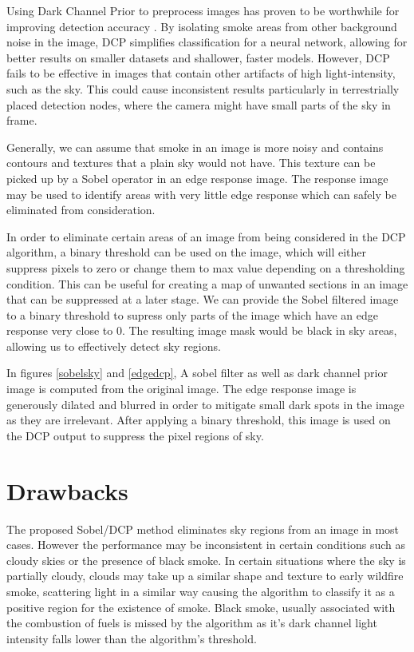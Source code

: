 \documentclass[lettersize,journal]{IEEEtran}
\begin{document}
Using Dark Channel Prior to preprocess images has proven to be
worthwhile for improving detection accuracy
\cite{dcpsmoke}\cite{dcpsmoke2}. By isolating smoke areas from other
background noise in the image, DCP simplifies classification for a
neural network, allowing for better results on smaller datasets and
shallower, faster models. However, DCP fails to be effective in images
that contain other artifacts of high light-intensity, such as the sky.
This could cause inconsistent results particularly in terrestrially
placed detection nodes, where the camera might have small parts of the
sky in frame.

Generally, we can assume that smoke in an image is more noisy and
contains contours and textures that a plain sky would not have. This
texture can be picked up by a Sobel operator in an edge response image.
The response image may be used to identify areas with very little edge
response which can safely be eliminated from consideration.

In order to eliminate certain areas of an image from being considered in
the DCP algorithm, a binary threshold can be used on the image, which
will either suppress pixels to zero or change them to max value
depending on a thresholding condition. This can be useful for creating a
map of unwanted sections in an image that can be suppressed at a later
stage. We can provide the Sobel filtered image to a binary threshold to
supress only parts of the image which have an edge response very close
to 0. The resulting image mask would be black in sky areas, allowing us
to effectively detect sky regions.

In figures \ref{sobelsky} and \ref{edgedcp}, A sobel filter as well as dark
channel prior image is computed from the original image. The edge
response image is generously dilated and blurred in order to mitigate
small dark spots in the image as they are irrelevant. After applying a
binary threshold, this image is used on the DCP output to suppress the
pixel regions of sky.

\section{Drawbacks}

The proposed Sobel/DCP method eliminates sky regions from an image in most cases.
However the performance may be inconsistent in certain conditions such as cloudy skies or the presence of black smoke.
In certain situations where the sky is partially cloudy, clouds may take up a similar shape and texture to early wildfire smoke, scattering light in a similar way causing the algorithm to classify it as a positive region for the existence of smoke. 
Black smoke, usually associated with the combustion of fuels is missed by the algorithm as it's dark channel light intensity falls lower than the algorithm's threshold. 
\end{document}
